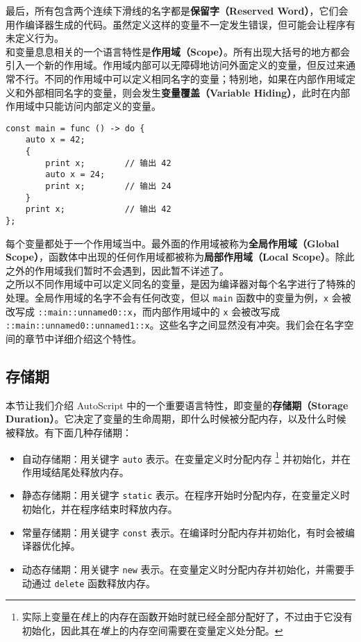 最后，所有包含两个连续下滑线的名字都是\textbf{保留字（Reserved Word）}，它们会用作编译器生成的代码。虽然定义这样的变量不一定发生错误，但可能会让程序有未定义行为。 \\

和变量息息相关的一个语言特性是\textbf{作用域（Scope）}。所有出现大括号的地方都会引入一个新的作用域。作用域内部可以无障碍地访问外面定义的变量，但反过来通常不行。不同的作用域中可以定义相同名字的变量；特别地，如果在内部作用域定义和外部相同名字的变量，则会发生\textbf{变量覆盖（Variable Hiding）}，此时在内部作用域中只能访问内部定义的变量。

\begin{lstlisting}
const main = func () -> do {
    auto x = 42;
    {
        print x;        // 输出 42
        auto x = 24;
        print x;        // 输出 24
    }
    print x;            // 输出 42
};
\end{lstlisting}

每个变量都处于一个作用域当中。最外面的作用域被称为\textbf{全局作用域（Global Scope）}，函数体中出现的任何作用域都被称为\textbf{局部作用域（Local Scope）}。除此之外的作用域我们暂时不会遇到，因此暂不详述了。 \\

之所以不同作用域中可以定义同名的变量，是因为编译器对每个名字进行了特殊的处理。全局作用域的名字不会有任何改变，但以 \lstinline!main! 函数中的变量为例，\lstinline!x! 会被改写成 \lstinline!::main::unnamed0::x!，而内部作用域中的 \lstinline!x! 会被改写成 \lstinline!::main::unnamed0::unnamed1::x!。这些名字之间显然没有冲突。我们会在名字空间的章节中详细介绍这个特性。

\subsection{存储期}

本节让我们介绍 AutoScript 中的一个重要语言特性，即变量的\textbf{存储期（Storage Duration）}。它决定了变量的生命周期，即什么时候被分配内存，以及什么时候被释放。有下面几种存储期：

\begin{itemize}
    \item 自动存储期：用关键字 \lstinline!auto! 表示。在变量定义时分配内存 \footnote{实际上变量在\emph{栈}上的内存在函数开始时就已经全部分配好了，不过由于它没有初始化，因此其在\emph{堆}上的内存空间需要在变量定义处分配。} 并初始化，并在作用域结尾处释放内存。

    \item 静态存储期：用关键字 \lstinline!static! 表示。在程序开始时分配内存，在变量定义时初始化，并在程序结束时释放内存。

    \item 常量存储期：用关键字 \lstinline!const! 表示。在编译时分配内存并初始化，有时会被编译器优化掉。

    \item 动态存储期：用关键字 \lstinline!new! 表示。在变量定义时分配内存并初始化，并需要手动通过 \lstinline!delete! 函数释放内存。
\end{itemize}

